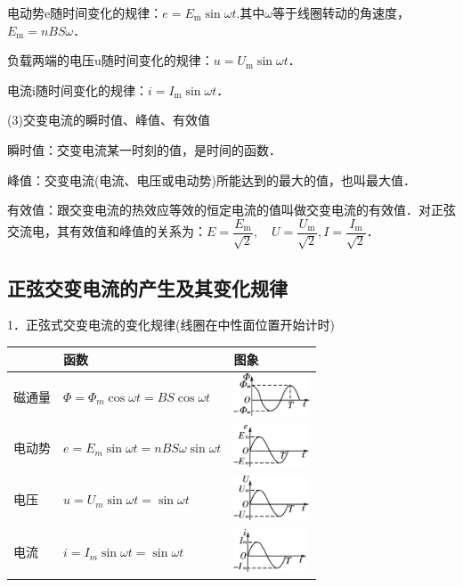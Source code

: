 电动势e随时间变化的规律：$e=E_{\mathrm{m}} \sin \omega t$.其中$\omega$等于线圈转动的角速度，$E_{\mathrm{m}}=n B S \omega$．

负载两端的电压u随时间变化的规律：$u=U_{\mathrm{m}} \sin \omega t$．

电流i随时间变化的规律：$i=I_{\mathrm{m}} \sin \omega t$．

(3)交变电流的瞬时值、峰值、有效值

瞬时值：交变电流某一时刻的值，是时间的函数．

峰值：交变电流(电流、电压或电动势)所能达到的最大的值，也叫最大值．

有效值：跟交变电流的热效应等效的恒定电流的值叫做交变电流的有效值．对正弦交流电，其有效值和峰值的关系为：$E=\dfrac{E_{\mathrm{m}}}{\sqrt{2}}, \quad U=\dfrac{U_{\mathrm{m}}}{\sqrt{2}}, I=\dfrac{I_{\mathrm{m}}}{\sqrt{2}}$．
\newpage
\subsection{正弦交变电流的产生及其变化规律}

1．正弦式交变电流的变化规律(线圈在中性面位置开始计时)

\begin{longtable}[]{@{}m{1.5cm}m{5cm}m{3cm}@{}}
\toprule
& 函数 & 图象\tabularnewline
\midrule
\endhead
磁通量 & $\Phi=\Phi_m\cos \omega t=BS\cos  \omega t$ &
\includegraphics[width=0.89653in,height=0.5in]{media/image439.png}\tabularnewline
电动势 & $e=E_m\sin \omega t=nBS\omega\sin \omega t $&
\includegraphics[width=0.87708in,height=0.49028in]{media/image440.png}\tabularnewline
电压 & $u=U_m\sin \omega t=\sin \omega t$ &
\includegraphics[width=0.87708in,height=0.51875in]{media/image441.png}\tabularnewline
电流 & $i=I_m\sin \omega t=\sin \omega t$ &
\includegraphics[width=0.84931in,height=0.5in]{media/image442.png}\tabularnewline
\bottomrule
\end{longtable}

